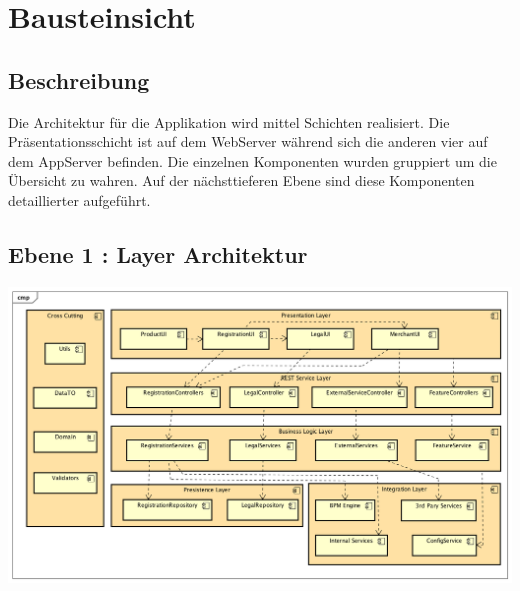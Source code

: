 \graphicspath{{./images/}}

\chapter{Bausteinsicht}

\section{Beschreibung}

Die Architektur für die Applikation wird mittel Schichten realisiert. Die Präsentationsschicht ist auf dem WebServer während sich die anderen vier auf dem AppServer befinden. Die einzelnen Komponenten wurden gruppiert um die Übersicht zu wahren. Auf der nächsttieferen Ebene sind diese Komponenten detaillierter aufgeführt.

\begin{landscape}
\section{Ebene 1 : Layer Architektur}

\begin{center}
	\includegraphics[scale=0.6]{ComponentLevel1.png}
\end{center}

\end{landscape}
\restoregeometry

